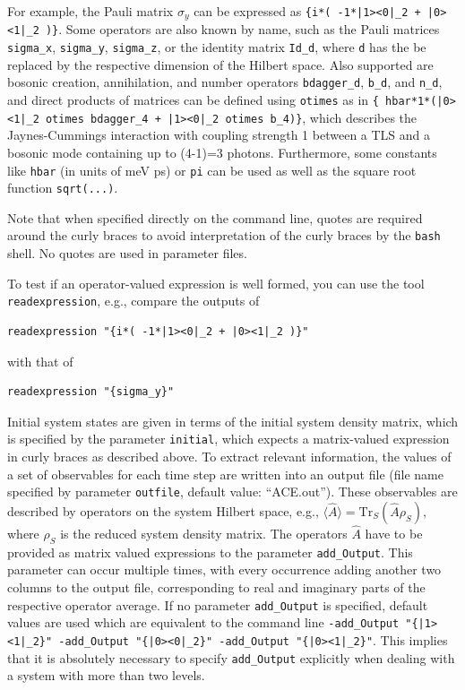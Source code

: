 \documentclass{scrartcl}
\begin{document}
For example, the Pauli matrix $\sigma_y$ can be expressed as
\verb#{i*( -1*|1><0|_2 + |0><1|_2 )}#.
Some operators are also known by name, such as the Pauli matrices 
\verb+sigma_x+, \verb+sigma_y+, \verb+sigma_z+, or the identity matrix 
\verb+Id_d+, where \verb#d# has the be replaced by the respective dimension 
of the Hilbert space. Also supported are bosonic creation, annihilation, and
number operators \verb+bdagger_d+, \verb+b_d+, and \verb+n_d+, and direct 
products of matrices can be defined using \verb+otimes+ as in 
\verb#{ hbar*1*(|0><1|_2 otimes bdagger_4 + |1><0|_2 otimes b_4)}#,
which describes the Jaynes-Cummings interaction with coupling strength 1 
between a TLS and a bosonic mode containing up to (4-1)=3 photons.
Furthermore, some constants like \verb#hbar# 
(in units of meV ps) or \verb#pi# can be used as well as the square root
function \verb#sqrt(...)#.

Note that when specified directly on the command line, 
quotes are required around the curly braces to avoid interpretation 
of the curly braces by the \texttt{bash} shell. No quotes are used in 
parameter files.

To test if an operator-valued expression is well formed, you can use 
the tool \verb#readexpression#, e.g., compare the outputs of 
\begin{verbatim}
readexpression "{i*( -1*|1><0|_2 + |0><1|_2 )}"
\end{verbatim}
with that of
\begin{verbatim}
readexpression "{sigma_y}"
\end{verbatim}


Initial system states are given in terms of the initial system density matrix,
which is specified by the parameter
\verb#initial#, which expects a matrix-valued expression in curly braces as
described above.
To extract relevant information, the values of a set of observables for 
each time step are written into an output file (file name specified by
parameter \verb#outfile#, default value: ``ACE.out'').
These observables are described by operators on the system Hilbert space, 
e.g., $\langle \hat{A}\rangle = \textrm{Tr}_S( \hat{A} \rho_S)$, 
where $\rho_S$ is the reduced system density matrix. 
The operators $\hat{A}$ have to be provided as matrix valued expressions
to the parameter \verb+add_Output+. This parameter can occur 
multiple times, with every occurrence adding another two columns to the output
file, corresponding to real and imaginary parts of the respective operator
average. If no parameter \verb+add_Output+ is specified, default values are
used which are equivalent to the command line
\verb+-add_Output "{|1><1|_2}" -add_Output "{|0><0|_2}" -add_Output "{|0><1|_2}"+. 
This implies that it is absolutely necessary to specify \verb+add_Output+
explicitly when dealing with a system with more than two levels.
\end{document}
